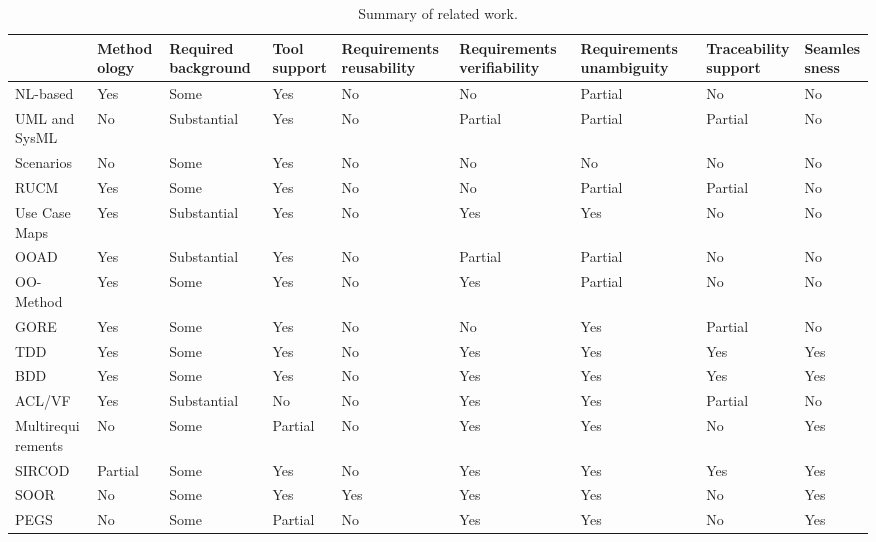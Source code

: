 \begin{table*}
\small 
\centering
    \begin{tabular}[M]{|p{2.5cm} | p{1.7cm}| p{1.5cm}| p{1.0cm}| p{1.7cm}| p{1.7cm} |p{1.7cm}| p{1.5cm}| p{1.7cm}|}
    \hline
& Methodology & Required \newline background & Tool \newline support & Requirements reusability & Requirements  \newline verifiability & Requirements \newline unambiguity & Traceability \newline support & Seamlessness \\
\hline
NL-based & Yes & Some & Yes & No & No & Partial&No&No \\
UML and SysML & No & Substantial & Yes & No & Partial & Partial & Partial & No \\
Scenarios & No & Some & Yes & No & No & No & No & No \\
RUCM & Yes & Some & Yes & No & No & Partial & Partial & No \\
Use Case Maps & Yes & Substantial & Yes & No & Yes & Yes & No & No \\
OOAD & Yes & Substantial & Yes & No & Partial & Partial & No & No \\
OO-Method & Yes & Some & Yes & No & Yes & Partial & No & No \\
GORE & Yes & Some & Yes & No & No & Yes & Partial & No \\
TDD & Yes & Some & Yes & No & Yes & Yes & Yes & Yes \\ 
BDD & Yes & Some & Yes & No & Yes & Yes & Yes & Yes \\
ACL/VF & Yes & Substantial & No & No & Yes & Yes & Partial & No \\
Multirequirements & No & Some & Partial & No & Yes & Yes & No & Yes \\
SIRCOD & Partial & Some & Yes & No & Yes & Yes & Yes & Yes \\
SOOR & No & Some & Yes & Yes & Yes & Yes & No & Yes \\
PEGS & No & Some & Partial & No & Yes & Yes & No & Yes \\
\hline
    \end{tabular}
    \caption{Summary of related work.}
    \label{tab:related_work}
\end{table*}
\endgroup
